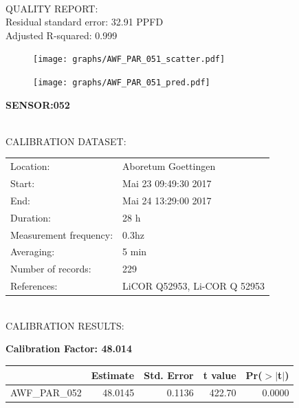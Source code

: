 \documentclass[oneside]{report}
\begin{document}
\hrulefill\\
QUALITY REPORT:\\
Residual standard error: 32.91 PPFD\\
Adjusted R-squared: 0.999



\begin{figure}[H]
  \centering
  \texttt{[image: graphs/AWF\_PAR\_051\_scatter.pdf]}
\end{figure}




\begin{figure}[H]
  \centering
  \texttt{[image: graphs/AWF\_PAR\_051\_pred.pdf]}
\end{figure}

\pagebreak


\begin{center}
\large{\textbf{SENSOR:052}}\\
\end{center}

\hrulefill\\
CALIBRATION DATASET:\\
\begin{table}[h!]
  \centering
  \label{tab:table1}
  \begin{tabular}{ll}
    Location: & Aboretum Goettingen\\ 
    
    
    Start:  & Mai 23 09:49:30 2017 \\
    End:   & Mai 24 13:29:00 2017\\ 
    Duration: & 28 h\\
    Measurement frequency: & 0.3hz\\
    Averaging:  &5 min\\
    Number of records: & 229 \\
    References: & LiCOR Q52953, Li-COR Q 52953 \\
  \end{tabular}
\end{table}

\hrulefill\\
CALIBRATION RESULTS:\\


\begin{center}
\textbf{\large{Calibration Factor: 48.014}}\\
\end{center}
\begin{table}[ht]
\centering
\begin{tabular}{rrrrr}
  \hline
 & Estimate & Std. Error & t value & Pr($>$$|$t$|$) \\ 
  \hline
AWF\_PAR\_052 & 48.0145 & 0.1136 & 422.70 & 0.0000 \\ 
   \hline
\end{tabular}
\end{table}
\end{document}
